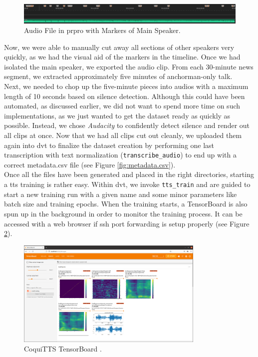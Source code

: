 \documentclass[
  a4paper,  %
  twoside,  %
  bibliography=totoc,
  headsepline,
  cleardoublepage=empty,
  parskip=half,
  draft=false
]{scrbook}
\begin{document}
\begin{figure}[h]
  \centering
  \includegraphics[width=1\textwidth]{./graphics/tts/premier with markers.png}
  \caption{Audio File in \gls{prpro} with Markers of Main Speaker.}
  \label{fig:premier-markers}
\end{figure}

Now, we were able to manually cut away all sections of other speakers very quickly, as we had the visual aid of the markers in the timeline. Once we had isolated the main speaker, we exported the audio clip. From each 30-minute news segment, we extracted approximately five minutes of anchorman-only talk.\\
Next, we needed to chop up the five-minute pieces into audios with a maximum length of 10 seconds based on silence detection. Although this could have been automated, as discussed earlier, we did not want to spend more time on such implementations, as we just wanted to get the dataset ready as quickly as possible. Instead, we chose \textit{Audacity} to confidently detect silence and render out all clips at once. Now that we had all clips cut out cleanly, we uploaded them again into \gls{dvt} to finalize the dataset creation by performing one last transcription with text normalization (\verb|transcribe_audio|) to end up with a correct metadata.csv file (see Figure \ref{fig:metadata.csv}). \\
Once all the files have been generated and placed in the right directories, starting a \gls{tts} training is rather easy. Within \gls{dvt}, we invoke \verb|tts_train| and are guided to start a new training run with a given name and some minor parameters like batch size and training epochs. When the training starts, a TensorBoard is also spun up in the background in order to monitor the training process. It can be accessed with a web browser if \gls{ssh} port forwarding is setup properly (see Figure \ref{fig:tensorboard}).

\begin{figure}[h]
  \centering
  \includegraphics[width=0.8\textwidth]{./graphics/tts/tensorboard.png}
  \caption{CoquiTTS TensorBoard \cite{TensorboardPngMbarnig2022}.}
  \label{fig:tensorboard}
\end{figure}
\end{document}
